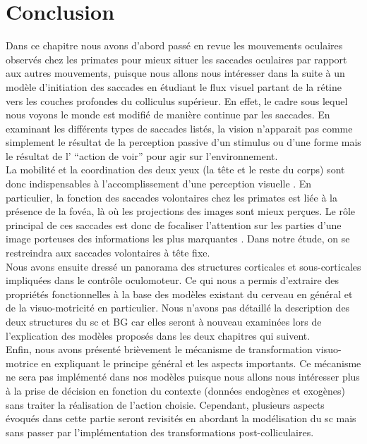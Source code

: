  


\section{Conclusion}


Dans ce chapitre nous avons d'abord passé en revue les mouvements oculaires observés chez les primates pour mieux situer les saccades oculaires par rapport aux autres mouvements, puisque nous allons nous intéresser dans la suite à un modèle d'initiation des saccades en étudiant le flux visuel partant de la rétine vers les couches profondes du colliculus supérieur. En effet, le cadre sous lequel nous voyons le monde est modifié de manière continue par les saccades. En examinant les différents types de saccades listés, la vision n'apparait pas comme simplement le résultat de la perception passive d'un stimulus ou d'une forme mais le résultat de l' ``action de voir'' pour agir sur l'environnement.\\




La mobilité et la coordination des deux yeux (la tête et le reste du corps) sont donc indispensables à l'accomplissement d'une perception visuelle \cite{Proudlock:2007}. En particulier, la fonction des saccades volontaires chez les primates est liée à la présence de la fovéa, là o\`u les projections des images sont mieux perçues. Le rôle principal de ces saccades est donc de focaliser l'attention sur les parties d'une image porteuses des informations les plus marquantes \cite{Yarbus:1967}.%
Dans notre étude, on se restreindra aux saccades volontaires à tête fixe.\\

Nous avons ensuite dressé un panorama des structures corticales et sous-corticales impliquées dans le contrôle oculomoteur. Ce qui nous a permis d'extraire des propriétés fonctionnelles à la base des modèles existant du cerveau en général et de la visuo-motricité en particulier. Nous n'avons pas détaillé la description des deux structures du \gls{sc} et BG car elles seront à nouveau examinées lors de l'explication des modèles proposés dans les deux chapitres qui suivent.\\ 

Enfin, nous avons présenté brièvement le mécanisme de transformation visuo-motrice en expliquant le principe général et les aspects importants. Ce mécanisme ne sera pas implémenté dans nos modèles puisque nous allons nous intéresser plus à la prise de décision en fonction du contexte (données endogènes et exogènes) sans traiter la réalisation de l'action choisie. Cependant, plusieurs aspects évoqués dans cette partie seront revisités en abordant la modélisation du \gls{sc} mais sans passer par l'implémentation des transformations post-colliculaires.\\

